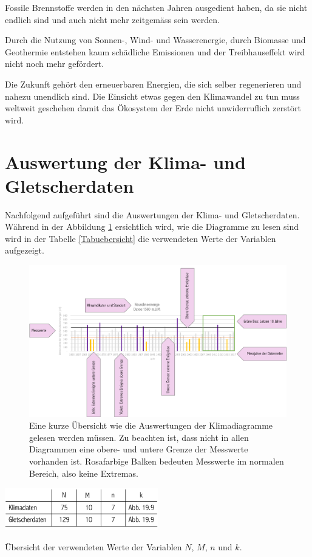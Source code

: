 \begin{refsection}
Fossile Brennstoffe werden in den nächsten Jahren ausgedient haben, da sie nicht endlich sind und auch nicht mehr zeitgemäss sein werden.

Durch die Nutzung von Sonnen-, Wind- und Wasserenergie, durch Biomasse und Geothermie entstehen kaum schädliche Emissionen und der Treibhauseffekt wird nicht noch mehr gefördert.

Die Zukunft gehört den erneuerbaren Energien, die sich selber regenerieren und nahezu unendlich sind. Die Einsicht etwas gegen den Klimawandel zu tun muss weltweit geschehen damit das Ökosystem der Erde nicht unwiderruflich zerstört wird.


\section{Auswertung der Klima- und Gletscherdaten} \label{AuswertungKG}
Nachfolgend aufgeführt sind die Auswertungen der Klima- und Gletscherdaten. Während in der Abbildung \ref{KlimaDia} ersichtlich wird, wie die Diagramme zu lesen sind wird in der Tabelle \ref{Tabuebersicht} die verwendeten Werte der Variablen aufgezeigt.


\begin{figure}
\centering
\includegraphics[width=1.0\textwidth]{extrem/Klimadiagrammlesen.pdf}
\caption{Eine kurze Übersicht wie die Auswertungen der Klimadiagramme gelesen werden müssen. Zu beachten ist, dass nicht in allen Diagrammen eine obere- und untere Grenze der Messwerte vorhanden ist. Rosafarbige Balken bedeuten Messwerte im normalen Bereich, also keine Extremas.}
\label{KlimaDia}
\end{figure}

\begin{table}
\centering
\includegraphics[width=0.5\textwidth]{extrem/Tabuebersicht.pdf}
\caption{Übersicht der verwendeten Werte der Variablen $N$, $M$, $n$ und $k$.}
\label{Tabuebersicht}
\end{table}



\end{refsection}
